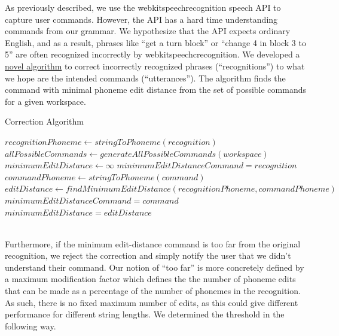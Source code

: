 \documentclass[]{article}
\begin{document}
As previously described, we use the webkitspeechrecognition speech API to capture user commands. However, the API has a hard time understanding commands from our grammar. We hypothesize that the API expects ordinary English, and as a result, phrases like ``get a turn block'' or ``change 4 in block 3 to 5'' are often recognized incorrectly by webkitspeechcrecognition. We developed a \hyperref[CorrectionAlgorithm]{novel algorithm} to correct incorrectly recognized phrases (``recognitions'') to what we hope are the intended commands (``utterances''). The algorithm finds the command with minimal phoneme edit distance from the set of possible commands for a given workspace.
\begin{algorithm}
	\caption{Correction Algorithm}\label{CorrectionAlgorithm}
	\begin{algorithmic}[1]
		\State $recognitionPhoneme \leftarrow stringToPhoneme(recognition)$
		\State $allPossibleCommands\leftarrow generateAllPossibleCommands(workspace) $
		\State $minimumEditDistance \leftarrow \infty$
		\State $minimumEditDistanceCommand = recognition$
			\State $commandPhoneme \leftarrow stringToPhoneme(command)$
			\State $editDistance \leftarrow findMinimumEditDistance(recognitionPhoneme, commandPhoneme)$
				\State $minimumEditDistanceCommand = command$
				\State $minimumEditDistance = editDistance$
			\EndIf
		\EndFor
		\State {}
		\EndProcedure
	\end{algorithmic}
\end{algorithm}\\
Furthermore, if the minimum edit-distance command is too far from the original recognition, we reject the correction and simply notify the user that we didn't understand their command. Our notion of ``too far'' is more concretely defined by a maximum modification factor which defines the the number of phoneme edits that can be made as a percentage of the number of phonemes in the recognition. As such, there is no fixed maximum number of edits, as this could give different performance for different string lengths. We determined the threshold in the following way.
\end{document}
